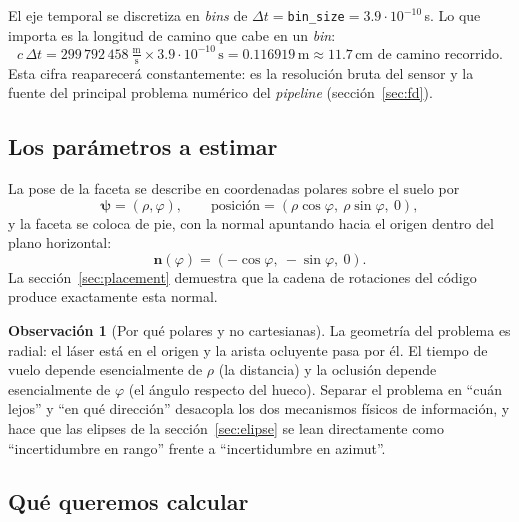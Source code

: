 \documentclass[11pt,a4paper]{article}
\newcommand{\vect}[1]{\boldsymbol{#1}}
\newcommand{\code}[1]{\texttt{#1}}
\theoremstyle{definition}
\newtheorem{obs}{Observación}
\theoremstyle{plain}
\begin{document}
El eje temporal se discretiza en \emph{bins} de
$\Delta t=$\code{bin\_size}$=3.9\cdot10^{-10}\,$s. Lo que importa es la longitud
de camino que cabe en un \emph{bin}:
%
\begin{equation}
\label{eq:cdt}
c\,\Delta t = 299\,792\,458\ \tfrac{\text{m}}{\text{s}}
\times 3.9\cdot10^{-10}\,\text{s} = 0.116919\,\text{m}
\approx 11.7\,\text{cm de camino recorrido}.
\end{equation}
%
Esta cifra reaparecerá constantemente: es la resolución bruta del sensor y la
fuente del principal problema numérico del \emph{pipeline}
(sección~\ref{sec:fd}).

\subsection{Los parámetros a estimar}

La pose de la faceta se describe en coordenadas polares sobre el suelo por
%
\begin{equation}
\label{eq:psi}
\vect\psi = (\rho,\varphi),
\qquad
\text{posición} = (\rho\cos\varphi,\ \rho\sin\varphi,\ 0),
\end{equation}
%
y la faceta se coloca de pie, con la normal apuntando hacia el origen dentro del
plano horizontal:
%
\begin{equation}
\label{eq:normal}
\vect n(\varphi) = (-\cos\varphi,\ -\sin\varphi,\ 0).
\end{equation}
%
La sección~\ref{sec:placement} demuestra que la cadena de rotaciones del código
produce exactamente esta normal.

\begin{obs}[Por qué polares y no cartesianas]
La geometría del problema es radial: el láser está en el origen y la arista
ocluyente pasa por él. El tiempo de vuelo depende esencialmente de $\rho$ (la
distancia) y la oclusión depende esencialmente de $\varphi$ (el ángulo respecto
del hueco). Separar el problema en \enquote{cuán lejos} y \enquote{en qué
dirección} desacopla los dos mecanismos físicos de información, y hace que las
elipses de la sección~\ref{sec:elipse} se lean directamente como
\enquote{incertidumbre en rango} frente a \enquote{incertidumbre en azimut}.
\end{obs}

\subsection{Qué queremos calcular}
\end{document}
